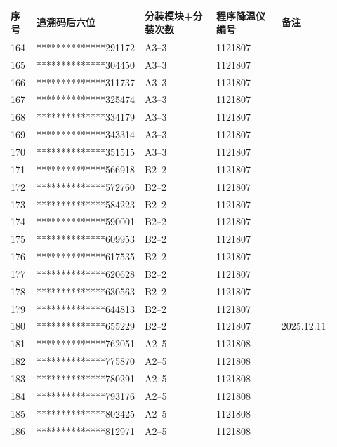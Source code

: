 \documentclass[UTF8,10pt,a4paper,fontset=fandol]{ctexart}
\newcommand{\fieldvalue}[1]{#1}
\newcommand{\handwritten}[1]{#1}
\begin{document}
\begin{center}
\small
\begin{tabular}{|p{0.08\linewidth}|p{0.30\linewidth}|p{0.22\linewidth}|p{0.20\linewidth}|p{0.12\linewidth}|}
\hline
序号 & 追溯码后六位 & 分装模块+分装次数 & 程序降温仪编号 & 备注 \\
\hline
164 & **************291172 & A3--3 & 1121807 & \\
\hline
165 & **************304450 & A3--3 & 1121807 & \\
\hline
166 & **************311737 & A3--3 & 1121807 & \\
\hline
167 & **************325474 & A3--3 & 1121807 & \\
\hline
168 & **************334179 & A3--3 & 1121807 & \\
\hline
169 & **************343314 & A3--3 & 1121807 & \\
\hline
170 & **************351515 & A3--3 & 1121807 & \\
\hline
171 & **************566918 & B2--2 & 1121807 & \\
\hline
172 & **************572760 & B2--2 & 1121807 & \\
\hline
173 & **************584223 & B2--2 & 1121807 & \\
\hline
174 & **************590001 & B2--2 & 1121807 & \\
\hline
175 & **************609953 & B2--2 & 1121807 & \\
\hline
176 & **************617535 & B2--2 & 1121807 & \\
\hline
177 & **************620628 & B2--2 & 1121807 & \\
\hline
178 & **************630563 & B2--2 & 1121807 & \\
\hline
179 & **************644813 & B2--2 & 1121807 & \\
\hline
180 & **************655229 & B2--2 & 1121807 &
\fieldvalue{\handwritten{2025.12.11}} \\
\hline
181 & **************762051 & A2--5 & 1121808 & \\
\hline
182 & **************775870 & A2--5 & 1121808 & \\
\hline
183 & **************780291 & A2--5 & 1121808 & \\
\hline
184 & **************793176 & A2--5 & 1121808 & \\
\hline
185 & **************802425 & A2--5 & 1121808 & \\
\hline
186 & **************812971 & A2--5 & 1121808 &

\end{tabular}
\end{center}
\end{document}

